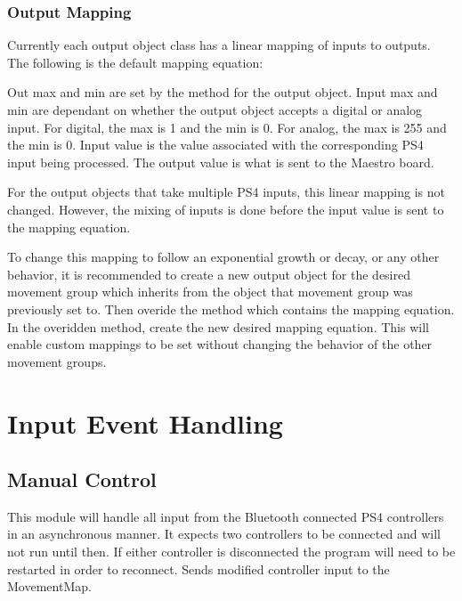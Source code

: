 \documentclass[letterpaper,10pt,english]{sphinxmanual}
\begin{document}
\subsection{Output Mapping}
\label{\detokenize{mapchange:output-mapping}}
\sphinxAtStartPar
Currently each output object class has a linear mapping of inputs
to outputs. The following is the default mapping equation:

\sphinxAtStartPar
{}

\sphinxAtStartPar
Out max and min are set by the  method for the output
object. Input max and min are dependant on whether the output object
accepts a digital or analog input. For digital, the max is 1 and the
min is 0. For analog, the max is 255 and the min is 0. Input value is
the value associated with the corresponding PS4 input being processed.
The output value is what is sent to the Maestro board.

\sphinxAtStartPar
For the output objects that take multiple PS4 inputs, this linear
mapping is not changed. However, the mixing of inputs is done before
the input value is sent to the mapping equation.

\sphinxAtStartPar
To change this mapping to follow an exponential growth or decay, or
any other behavior, it is recommended to create a new output object
for the desired movement group which inherits from the object that
movement group was previously set to. Then overide the 
method which contains the mapping equation. In the overidden method,
create the new desired mapping equation. This will enable custom
mappings to be set without changing the behavior of the other
movement groups.


\chapter{Input Event Handling}
\label{\detokenize{input:input-event-handling}}\label{\detokenize{input::doc}}

\section{Manual Control}
\label{\detokenize{manualcontrol:module-manualControl}}\label{\detokenize{manualcontrol:manual-control}}\label{\detokenize{manualcontrol::doc}}
\sphinxAtStartPar
This module will handle all input from the Bluetooth connected PS4 controllers in an asynchronous manner. It expects two controllers to be connected 
and will not run until then. If either controller is disconnected the program will need to be restarted in order to reconnect.
Sends modified controller input to the MovementMap.
\end{document}
